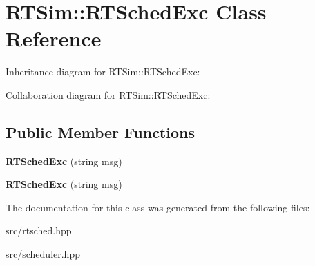 \hypertarget{classRTSim_1_1RTSchedExc}{}\section{R\+T\+Sim\+:\+:R\+T\+Sched\+Exc Class Reference}
\label{classRTSim_1_1RTSchedExc}


Inheritance diagram for R\+T\+Sim\+:\+:R\+T\+Sched\+Exc\+:


Collaboration diagram for R\+T\+Sim\+:\+:R\+T\+Sched\+Exc\+:
\subsection*{Public Member Functions}
\begin{DoxyCompactItemize}
\item 
{\bfseries R\+T\+Sched\+Exc} (string msg)\hypertarget{classRTSim_1_1RTSchedExc_a3c08e1a2687a15ac133957e71a667f3b}{}\label{classRTSim_1_1RTSchedExc_a3c08e1a2687a15ac133957e71a667f3b}

\item 
{\bfseries R\+T\+Sched\+Exc} (string msg)\hypertarget{classRTSim_1_1RTSchedExc_a3c08e1a2687a15ac133957e71a667f3b}{}\label{classRTSim_1_1RTSchedExc_a3c08e1a2687a15ac133957e71a667f3b}

\end{DoxyCompactItemize}


The documentation for this class was generated from the following files\+:\begin{DoxyCompactItemize}
\item 
src/rtsched.\+hpp\item 
src/scheduler.\+hpp\end{DoxyCompactItemize}
